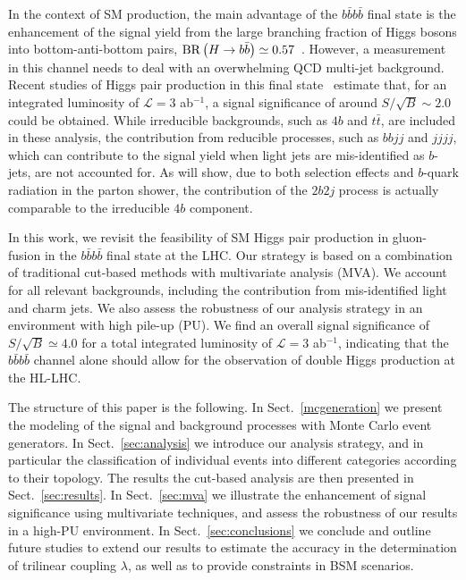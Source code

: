 In the context of SM production,
the main advantage of the $b\bar{b}b\bar{b}$ final state is the
enhancement of the signal yield
from the large branching fraction of Higgs bosons into bottom-anti-bottom
pairs, ${\rm BR}\left( H\to b\bar{b}\right)\simeq 0.57$~\cite{Dittmaier:2012vm}.
%
However, a measurement in this channel
needs to deal with an overwhelming QCD multi-jet background.
%
Recent studies of Higgs pair production in this
final state~\cite{Wardrope:2014kya,deLima:2014dta}
estimate that, for an integrated
luminosity of
$\mathcal{L}=3$ ab$^{-1}$,
a signal significance of around $S/\sqrt{B}\sim 2.0$ could be obtained.
%
While irreducible backgrounds, such as $4b$ and
$t\bar{t}$, are included in these analysis, the contribution
from reducible processes, such as $bbjj$ and
$jjjj$, which can contribute to the signal yield when 
light jets are mis-identified as $b$-jets,
are not accounted for.
%
As will show, due to both
selection effects and $b$-quark radiation in the
parton shower, the
contribution of the $2b2j$ process is actually comparable to
the irreducible $4b$ component.

In this work, we revisit the feasibility of SM Higgs pair production in
gluon-fusion
in the $b\bar{b}b\bar{b}$ final state at the LHC.
%
 Our strategy is based on a combination of traditional cut-based
 methods with multivariate analysis (MVA).
  We account for  all relevant
  backgrounds, including the contribution from mis-identified
  light and charm jets.
  We also assess the robustness of our analysis strategy in
  an environment with high pile-up (PU).
  We find an overall signal significance of $S/\sqrt{B}\simeq 4.0$
  for a total integrated
  luminosity of $\mathcal{L}=3$ ab$^{-1}$,
   indicating
  that the $b\bar{b}b\bar{b}$ channel
alone should allow for the observation of double Higgs production
  at the HL-LHC.
% 
  
The structure of this paper is the following.
%
In Sect.~\ref{mcgeneration} we present the modeling of the signal
and background processes with Monte Carlo event generators.
%
In Sect.~\ref{sec:analysis}
we introduce our analysis strategy, and in particular
the classification of individual events into
different categories according to their topology.
%
The results the cut-based analysis
are then presented in Sect.~\ref{sec:results}.
%
In Sect.~\ref{sec:mva} we illustrate the enhancement of signal
significance using multivariate techniques, and
assess the robustness of our results in a high-PU environment.
%
In Sect.~\ref{sec:conclusions} we conclude and outline
future studies to extend our results to estimate the accuracy
in the determination of trilinear coupling $\lambda$, as well as
to provide
 constraints in
BSM scenarios.

